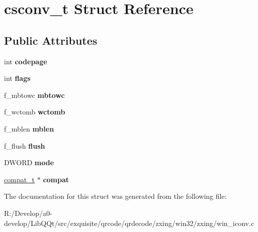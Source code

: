 \hypertarget{structcsconv__t}{}\section{csconv\+\_\+t Struct Reference}
\label{structcsconv__t}
\subsection*{Public Attributes}
\begin{DoxyCompactItemize}
\item 
\mbox{\label{structcsconv__t_af860d717ec46197715f7e4832d16dea0}} 
int {\bfseries codepage}
\item 
\mbox{\label{structcsconv__t_a346503dc1864dac0d0581454d0a6f67b}} 
int {\bfseries flags}
\item 
\mbox{\label{structcsconv__t_ad6acb90b62c51d399599a8fa6d581974}} 
f\+\_\+mbtowc {\bfseries mbtowc}
\item 
\mbox{\label{structcsconv__t_aa69767b4479a1a2ad7fad454cd361102}} 
f\+\_\+wctomb {\bfseries wctomb}
\item 
\mbox{\label{structcsconv__t_a8844be5c8aa777ba156050bb065448f3}} 
f\+\_\+mblen {\bfseries mblen}
\item 
\mbox{\label{structcsconv__t_ae20473b9862c6020fabf14f92d1b7051}} 
f\+\_\+flush {\bfseries flush}
\item 
\mbox{\label{structcsconv__t_a21a21669edd1944bca0342e33bc7e201}} 
D\+W\+O\+RD {\bfseries mode}
\item 
\mbox{\label{structcsconv__t_ab0e996dbf4b849bad60b770d2fe2f7e4}} 
\mbox{\hyperlink{structcompat__t}{compat\+\_\+t}} $\ast$ {\bfseries compat}
\end{DoxyCompactItemize}


The documentation for this struct was generated from the following file\+:\begin{DoxyCompactItemize}
\item 
R\+:/\+Develop/a0-\/develop/\+Lib\+Q\+Qt/src/exquisite/qrcode/qrdecode/zxing/win32/zxing/win\+\_\+iconv.\+c\end{DoxyCompactItemize}
